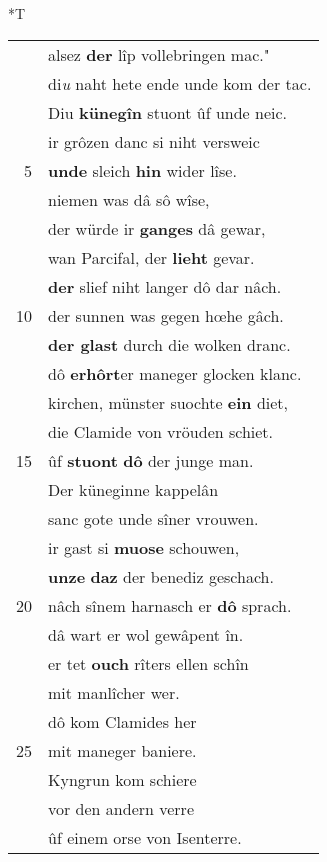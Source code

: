 \documentclass[8pt,a4paper,notitlepage]{article}
\begin{document}
\begin{table}[ht]
\begin{minipage}[t]{0.5\linewidth}
\end{minipage}
\hspace{0.5cm}
\begin{minipage}[t]{0.5\linewidth}
\small
\begin{center}*T
\end{center}
\begin{tabular}{rl}
 & alsez \textbf{der} lîp vollebringen mac."\\ 
 & di\textit{u} naht hete ende unde kom der tac.\\ 
 & Diu \textbf{künegîn} stuont ûf unde neic.\\ 
 & ir grôzen danc si niht versweic\\ 
5 & \textbf{unde} sleich \textbf{hin} wider lîse.\\ 
 & niemen was dâ sô wîse,\\ 
 & der würde ir \textbf{ganges} dâ gewar,\\ 
 & wan Parcifal, der \textbf{lieht} gevar.\\ 
 & \textbf{der} slief niht langer dô dar nâch.\\ 
10 & der sunnen was gegen hœhe gâch.\\ 
 & \textbf{der glast} durch die wolken dranc.\\ 
 & dô \textbf{erhôrt}er maneger glocken klanc.\\ 
 & kirchen, münster suochte \textbf{ein} diet,\\ 
 & die Clamide von vröuden schiet.\\ 
15 & ûf \textbf{stuont} \textbf{dô} der junge man.\\ 
 & Der küneginne kappelân\\ 
 & sanc gote unde sîner vrouwen.\\ 
 & ir gast si \textbf{muose} schouwen,\\ 
 & \textbf{unze} \textbf{daz} der benediz geschach.\\ 
20 & nâch sînem harnasch er \textbf{dô} sprach.\\ 
 & dâ wart er wol gewâpent în.\\ 
 & er tet \textbf{ouch} rîters ellen schîn\\ 
 & mit manlîcher wer.\\ 
 & dô kom Clamides her\\ 
25 & mit maneger baniere.\\ 
 & Kyngrun kom schiere\\ 
 & vor den andern verre\\ 
 & ûf einem orse von Isenterre.\\ 

\end{tabular}
\end{minipage}
\end{table}
\end{document}
